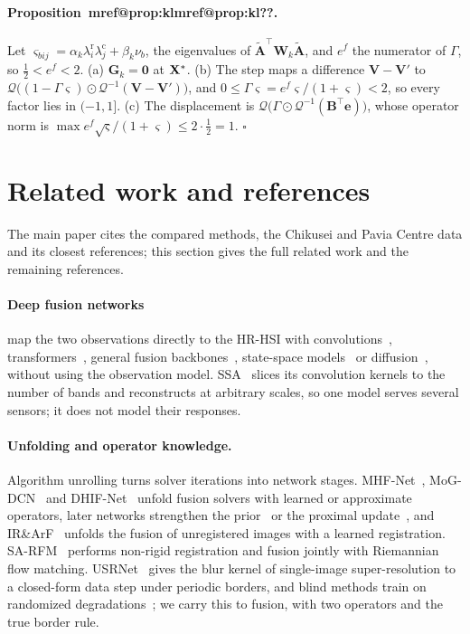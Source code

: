 \documentclass[10pt,twocolumn,letterpaper]{article}
\makeatletter
\newcommand{\mref}[1]{\ifcsname mref@#1\endcsname\csname mref@#1\endcsname\else\textbf{??}\fi}
\makeatother
\begin{document}
\paragraph{Proposition~\mref{prop:kl}.} Let $\varsigma_{bij}=\alpha_k\lambda^{\mathrm{r}}_i\lambda^{\mathrm{c}}_j+\beta_k\nu_b$, the eigenvalues of $\tilde{\mathbf{A}}^{\top}\mathbf{W}_k\tilde{\mathbf{A}}$, and $e^{f}$ the numerator of $\Gamma$, so $\tfrac12<e^{f}<2$. (a) $\mathbf{G}_k=\mathbf{0}$ at $\mathbf{X}^*$. (b) The step maps a difference $\mathbf{V}-\mathbf{V}'$ to $\mathcal{Q}\big((1-\Gamma\varsigma)\odot\mathcal{Q}^{-1}(\mathbf{V}-\mathbf{V}')\big)$, and $0\le\Gamma\varsigma=e^{f}\varsigma/(1+\varsigma)<2$, so every factor lies in $(-1,1]$. (c) The displacement is $\mathcal{Q}\big(\Gamma\odot\mathcal{Q}^{-1}(\mathbf{B}^{\top}\mathbf{e})\big)$, whose operator norm is $\max e^{f}\sqrt{\varsigma}/(1+\varsigma)\le2\cdot\tfrac12=1$. \hfill$\square$

\section{Related work and references}
\label{sec:related-full}
The main paper cites the compared methods, the Chikusei and Pavia Centre data and its closest references; this section gives the full related work and the remaining references.

\paragraph{Deep fusion networks} map the two observations directly to the HR-HSI with convolutions~\cite{zhang2021ssrnet}, transformers~\cite{deng2023psrt,ma2024reciprocal,li2024mimformer,fang2024mimosst,yang2026clsnet}, general fusion backbones~\cite{peng2023u2net}, state-space models~\cite{pei2026s3o} or diffusion~\cite{chen2026twostage}, without using the observation model. SSA~\cite{liang2026ssa} slices its convolution kernels to the number of bands and reconstructs at arbitrary scales, so one model serves several sensors; it does not model their responses.

\paragraph{Unfolding and operator knowledge.} Algorithm unrolling turns solver iterations into network stages. MHF-Net~\cite{xie2022mhfnet}, MoG-DCN~\cite{dong2021mogdcn} and DHIF-Net~\cite{huang2022dhif} unfold fusion solvers with learned or approximate operators, later networks strengthen the prior~\cite{yan2025smgu} or the proximal update~\cite{yu2025otpnet}, and IR\&ArF~\cite{qu2025irarf} unfolds the fusion of unregistered images with a learned registration. SA-RFM~\cite{zhang2026sarfm} performs non-rigid registration and fusion jointly with Riemannian flow matching. USRNet~\cite{zhang2020usrnet} gives the blur kernel of single-image super-resolution to a closed-form data step under periodic borders, and blind methods train on randomized degradations~\cite{zhang2021bsrgan}; we carry this to fusion, with two operators and the true border rule.
\end{document}
